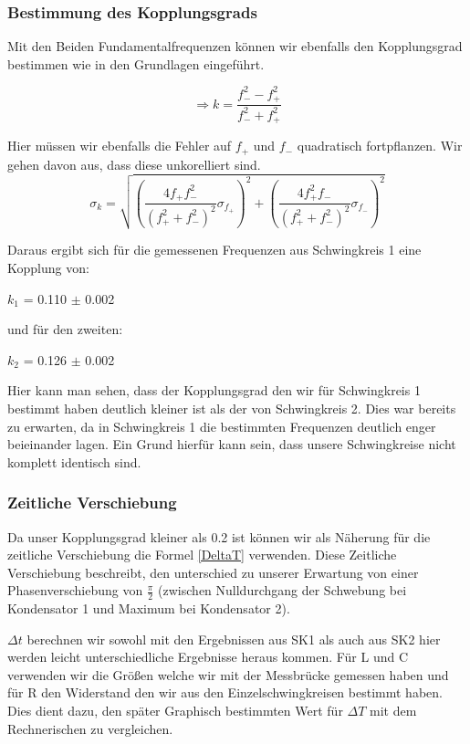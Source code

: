 \documentclass[twoside]{protokoll}
\begin{document}
\subsubsection{Bestimmung des Kopplungsgrads}

Mit den Beiden Fundamentalfrequenzen können wir ebenfalls den Kopplungsgrad bestimmen wie in den Grundlagen eingeführt.

\begin{equation}
    \Rightarrow k = \frac{f_-^2 - f_+^2}{f_-^2 + f_+^2}
    \label{Kopplungsgrad}
\end{equation}

Hier müssen wir ebenfalls die Fehler auf $f_+$ und $f_-$ quadratisch fortpflanzen. Wir gehen davon aus, dass diese unkorelliert sind.
\begin{equation}
    \sigma_k =\sqrt{\left(\frac{4f_+f_-^2}{\left(f_+^2+f_-^2\right)^2}\sigma_{f_+}\right)^2 + \left(\frac{4f_+^2f_-}{\left(f_+^2+f_-^2\right)^2}\sigma_{f_-}\right)^2}
    \label{Fehlerfortpflanzung_kopplung}
\end{equation}

Daraus ergibt sich für die gemessenen Frequenzen aus Schwingkreis 1 eine Kopplung von:
\begin{center}
$k_1$ = 0.110 $\pm$ 0.002
\end{center}
und für den zweiten:
\begin{center}
$k_2$ = 0.126 $\pm$ 0.002
\end{center}

Hier kann man sehen, dass der Kopplungsgrad den wir für Schwingkreis 1 bestimmt haben deutlich kleiner ist als der von Schwingkreis 2. 
Dies war bereits zu erwarten, da in Schwingkreis 1 die bestimmten Frequenzen deutlich enger beieinander lagen. 
Ein Grund hierfür kann sein, dass unsere Schwingkreise nicht komplett identisch sind. 

\subsubsection{Zeitliche Verschiebung}

Da unser Kopplungsgrad kleiner als 0.2 ist können wir als Näherung für die zeitliche Verschiebung die Formel \ref{DeltaT} verwenden. 
Diese Zeitliche Verschiebung beschreibt, den unterschied zu unserer Erwartung von einer Phasenverschiebung von $\frac{\pi}{2}$ (zwischen Nulldurchgang der Schwebung bei Kondensator 1 und Maximum bei Kondensator 2).

$\Delta t$ berechnen wir sowohl mit den Ergebnissen aus SK1 als auch aus SK2 hier werden leicht unterschiedliche Ergebnisse heraus kommen. 
Für L und C verwenden wir die Größen welche wir mit der Messbrücke gemessen haben und für R den Widerstand den wir aus den Einzelschwingkreisen bestimmt haben. \\
Dies dient dazu, den später Graphisch bestimmten Wert für $\Delta T$ mit dem Rechnerischen zu vergleichen.
\end{document}
